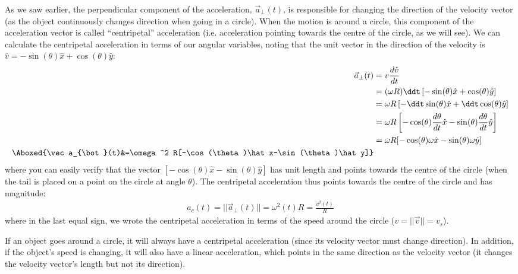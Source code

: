 As we saw earlier, the perpendicular component of the acceleration, $\vec a_{\bot}(t)$, is responsible for changing the direction of the velocity vector (as the object continuously changes direction when going in a circle). When the motion is around a circle, this component of the acceleration vector is called ``centripetal'' acceleration (i.e. acceleration pointing towards the centre of the circle, as we will see). We can calculate the centripetal acceleration in terms of our angular variables, noting that the unit vector in the direction of the velocity is $\hat v=-\sin(\theta)\hat x+\cos(\theta)\hat y$:
\begin{align}
\vec a_{\bot}(t)&=v\frac{d\hat v}{dt}\nonumber\\
&=(\omega R)\ddt \left[-\sin(\theta)\hat x+\cos(\theta)\hat y\right]\nonumber\\
&=\omega R \left[-\ddt\sin(\theta)\hat x+\ddt\cos(\theta)\hat y\right]\nonumber\\
&=\omega R \left[-\cos(\theta)\frac{d\theta}{dt}\hat x-\sin(\theta)\frac{d\theta}{dt}\hat y\right]\nonumber\\
&=\omega R [-\cos(\theta)\omega\hat x-\sin(\theta)\omega\hat y]\nonumber\\
\Aboxed{\vec a_{\bot}(t)&=\omega^2 R[-\cos(\theta)\hat x-\sin(\theta)\hat y]}
\end{align}
where you can easily verify that the vector $[-\cos(\theta)\hat x-\sin(\theta)\hat y]$ has unit length and points towards the centre of the circle (when the tail is placed on a point on the circle at angle $\theta$). The centripetal acceleration thus points towards the centre of the circle and has magnitude:
\begin{align}
a_c(t) = ||\vec a_{\bot}(t)||=\omega^2(t) R = \frac{v^2(t)}{R}
\end{align}
where in the last equal sign, we wrote the centripetal acceleration in terms of the speed around the circle ($v=||\vec v||=v_s$).

If an object goes around a circle, it will always have a centripetal acceleration (since its velocity vector must change direction). In addition, if the object's speed is changing, it will also have a linear acceleration, which points in the same direction as the velocity vector (it changes the velocity vector's length but not its direction).

